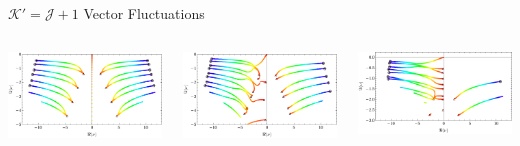 \documentclass[aspectratio=169, xcolor=dvipsnames]{beamer}
\begin{document}
\begin{frame}{\(\mathcal K' = \mathcal J + 1\) Vector Fluctuations}
  \begin{columns}[T]
    \begin{column}{0.33\textwidth}
      \includegraphics[width=1.05\textwidth]{figs/Vector_rp_10_grid_45_a_0.pdf}
    \end{column}

    \begin{column}{0.33\textwidth}
      \includegraphics[width=1.05\textwidth]{figs/Vector_rp_10_grid_45_a_1_2.pdf}
    \end{column}

    \begin{column}{0.33\textwidth}
      \includegraphics[width=1.05\textwidth]{figs/Vector_rp_10_grid_45_a_9_10.pdf}
    \end{column}
  \end{columns}


\end{frame}
\end{document}
